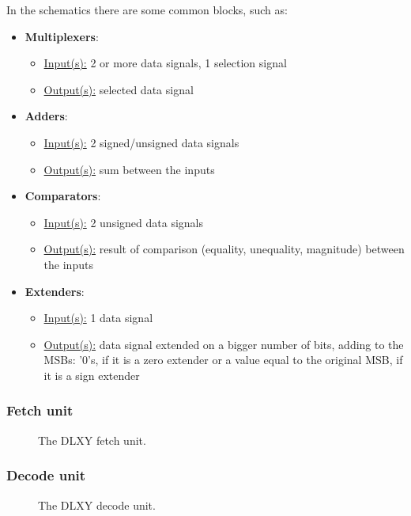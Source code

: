 \bigskip
In the schematics there are some common blocks, such as:
\begin{itemize}
	\item \textbf{Multiplexers}:
		\begin{itemize}
			\item \underline{Input(s):} 2 or more data signals,
				1 selection signal
			\item \underline{Output(s):} selected data signal
		\end{itemize}
	\item \textbf{Adders}:
		\begin{itemize}
			\item \underline{Input(s):} 2 signed/unsigned data signals
			\item \underline{Output(s):} sum between the inputs
		\end{itemize}
	\item \textbf{Comparators}:
		\begin{itemize}
			\item \underline{Input(s):} 2 unsigned data signals
			\item \underline{Output(s):} result of comparison
				(equality, unequality, magnitude) between the
				inputs
		\end{itemize}
	\item \textbf{Extenders}:
		\begin{itemize}
			\item \underline{Input(s):} 1 data signal
			\item \underline{Output(s):} data signal extended on
				a bigger number of bits, adding to the MSBs:
				'0's, if it is a zero extender or a value equal
				to the original MSB, if it is a sign extender
		\end{itemize}
\end{itemize}

\subsubsection{Fetch unit}
\begin{figure}[H]
	\centering
	\caption{The DLXY fetch unit.}
	\label{fig:fetch_unit}
\end{figure}
\subsubsection{Decode unit}
\begin{figure}[H]
	\centering
	\caption{The DLXY decode unit.}
	\label{fig:decode_unit}
\end{figure}
